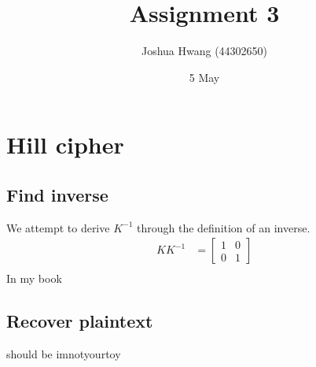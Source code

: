 \documentclass{article}
\title{Assignment 3}
\author{Joshua Hwang (44302650)}
\date{5 May}
\begin{document}
\maketitle

\section{Hill cipher}
\subsection{Find inverse}
We attempt to derive $K^{-1}$ through the definition of an inverse.
\begin{align*}
    KK^{-1}
    &=
    \begin{bmatrix}
        1 & 0 \\
        0 & 1
    \end{bmatrix} \\
\end{align*}
In my book

\subsection{Recover plaintext}
should be
imnotyourtoy
\end{document}
